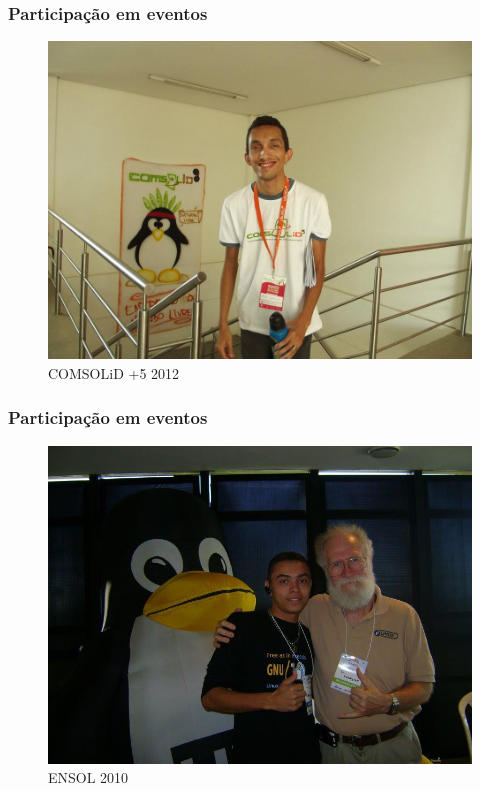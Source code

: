 \begin{frame}\frametitle{Participação em eventos}

\begin{figure}
   \includegraphics[scale=0.25]{img/atilacamurca-comsolid5.jpg}
   \caption{COMSOLiD +5 2012}
\end{figure}

\end{frame}

\begin{frame}\frametitle{Participação em eventos}

\begin{figure}
   \includegraphics[scale=0.3]{img/darlildo-ensol2010.jpg}
   \caption{ENSOL 2010}
\end{figure}

\end{frame}

